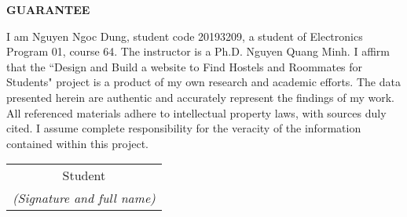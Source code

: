 \documentclass[../DoAn.tex]{subfiles}
\begin{document}
\begin{center}
    \Large{\textbf{GUARANTEE}}\\
\end{center}
\vspace{1cm}
I am Nguyen Ngoc Dung, student code 20193209, a student of Electronics Program 01, course 64.
The instructor is a Ph.D. Nguyen Quang Minh.
I affirm that the ``Design and Build a website to Find Hostels and Roommates for Students" project is a product of my own research and academic efforts.
The data presented herein are authentic and accurately represent the findings of my work.
All referenced materials adhere to intellectual property laws, with sources duly cited.
I assume complete responsibility for the veracity of the information contained within this project.
\begin{flushright}
    \begin{tabular}{@{}c@{}}
        Student \\
        \textit{(Signature and full name)}
    \end{tabular}
\end{flushright}
\end{document}
